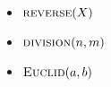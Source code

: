 
\begin{frame}
  
  \begin{columns}
      \begin{itemize}
        \setlength{\itemsep}{3pt}
        \item $\Call{reverse}{X}$
        \item \textcolor{lightgray}{$\Call{division}{n, m}$}
        \item $\Call{Euclid}{a, b}$
      \end{itemize}
  \end{columns}
\end{frame}




